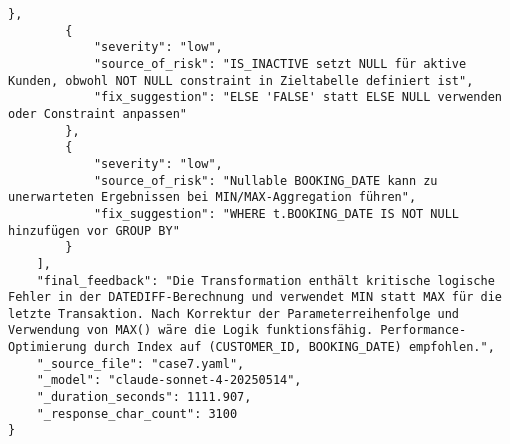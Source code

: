 \begin{lstlisting}[caption={Ausgabe: Claude Sonnet 4 Anwendungsfall 7 Hauptdurchlauf},label={claude_case7_prompt1}]
        },
        {
            "severity": "low",
            "source_of_risk": "IS_INACTIVE setzt NULL für aktive Kunden, obwohl NOT NULL constraint in Zieltabelle definiert ist",
            "fix_suggestion": "ELSE 'FALSE' statt ELSE NULL verwenden oder Constraint anpassen"
        },
        {
            "severity": "low",
            "source_of_risk": "Nullable BOOKING_DATE kann zu unerwarteten Ergebnissen bei MIN/MAX-Aggregation führen",
            "fix_suggestion": "WHERE t.BOOKING_DATE IS NOT NULL hinzufügen vor GROUP BY"
        }
    ],
    "final_feedback": "Die Transformation enthält kritische logische Fehler in der DATEDIFF-Berechnung und verwendet MIN statt MAX für die letzte Transaktion. Nach Korrektur der Parameterreihenfolge und Verwendung von MAX() wäre die Logik funktionsfähig. Performance-Optimierung durch Index auf (CUSTOMER_ID, BOOKING_DATE) empfohlen.",
    "_source_file": "case7.yaml",
    "_model": "claude-sonnet-4-20250514",
    "_duration_seconds": 1111.907,
    "_response_char_count": 3100
}
\end{lstlisting}

